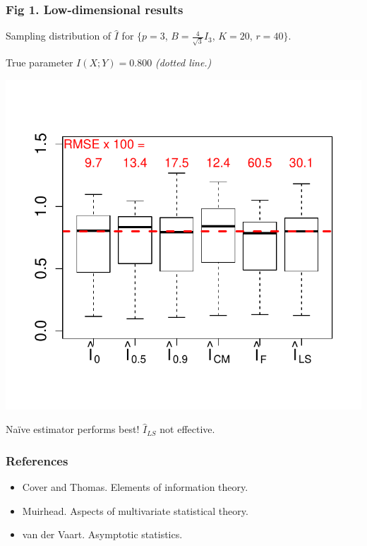 \documentclass{beamer}
\begin{document}
\begin{frame}
\frametitle{Fig 1. Low-dimensional results}
Sampling distribution of $\hat{I}$ for \small{$\{p = 3$, $B = \frac{4}{\sqrt{3}} I_3$, $K = 20$, $r = 40\}$.}

True parameter $I(X; Y) = 0.800$ \emph{(dotted line.)}
\begin{center}
\includegraphics[scale = 0.6, clip = true, trim = 0 0.5in 0 0.5in]{../info_theory_sims/fig1.pdf}
\end{center}
Na\"{i}ve estimator performs best!  $\hat{I}_{LS}$ not effective.
\end{frame}

\begin{frame}
\frametitle{References}
\begin{itemize}
\item Cover and Thomas.  Elements of information theory.
\item Muirhead.  Aspects of multivariate statistical theory.
\item van der Vaart.  Asymptotic statistics.
\end{itemize}
\end{frame}
\end{document}
